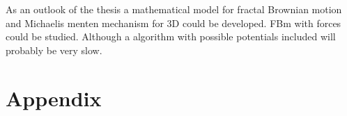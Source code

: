 \documentclass[
  a4paper,BCOR10mm,oneside,
  headsepline,footsepline,%
  fleqn,openbib
]{scrbook}
\begin{document}
As an outlook of the thesis a mathematical model for fractal Brownian motion and Michaelis menten mechanism for 3D could be developed. FBm with forces could be studied. Although a algorithm with possible potentials included will probably be very slow. 
 
 
\chapter{Appendix}
\end{document}
